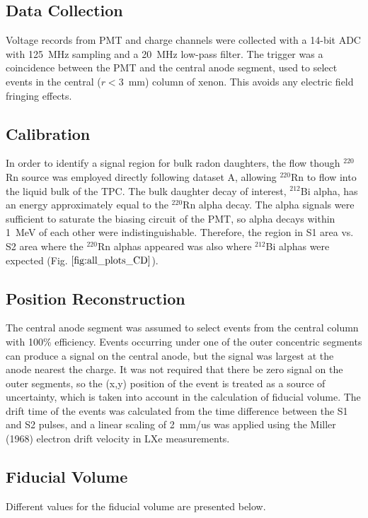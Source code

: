 \subsection{Data Collection}
\label{datacollection}
Voltage records from PMT and charge channels were collected with a 14-bit ADC with 125~MHz sampling and a 20~MHz low-pass filter. The trigger was a coincidence between the PMT and the central anode segment, used to select events in the central ($r<3$~mm) column of xenon. This avoids any electric field fringing effects. %

\subsection{Calibration}
In order to identify a signal region for bulk radon daughters, the flow though $^{220}$Rn source was employed directly following dataset A, allowing $^{220}$Rn to flow into the liquid bulk of the TPC. The bulk daughter decay of interest, $^{212}$Bi alpha, has an energy approximately equal to the $^{220}$Rn alpha decay. The alpha signals were sufficient to saturate the biasing circuit of the PMT, so alpha decays within 1~MeV of each other were indistinguishable. Therefore, the region in S1 area vs. S2 area where the $^{220}$Rn alphas appeared was also where $^{212}$Bi alphas were expected (Fig. $\ref{fig:all_plots_CD}$).

\subsection{Position Reconstruction}
The central anode segment was assumed to select events from the central column with 100\% efficiency. Events occurring under one of the outer concentric segments can produce a signal on the central anode, but the signal was largest at the anode nearest the charge. It was not required that there be zero signal on the outer segments, so the (x,y) position of the event is treated as a source of uncertainty, which is taken into account in the calculation of fiducial volume.
The drift time of the events was calculated from the time difference between the S1 and S2 pulses, and a linear scaling of 2~mm/us was applied using the Miller (1968) electron drift velocity in \ac{LXe} measurements. 

\subsection{Fiducial Volume}
Different values for the fiducial volume are presented below.


